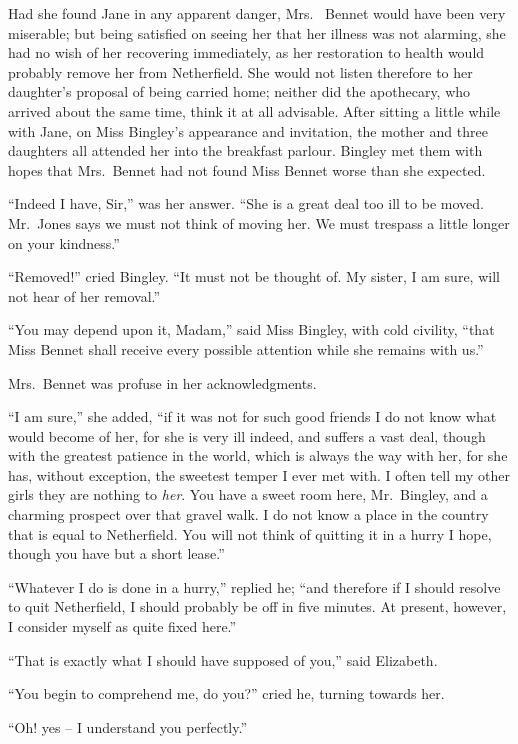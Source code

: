 Had she found Jane in any apparent danger, Mrs.\ %
Bennet would have been very miserable; but being
satisfied on seeing her that her illness was not alarming,
she had no wish of her recovering immediately, as her
restoration to health would probably remove her from
Netherfield. She would not listen therefore to her
daughter’s proposal of being carried home; neither did
the apothecary, who arrived about the same time, think
it at all advisable. After sitting a little while with Jane,
on Miss Bingley’s appearance and invitation, the mother
and three daughters all attended her into the breakfast
parlour. Bingley met them with hopes that Mrs.\ Bennet
had not found Miss Bennet worse than she expected.

“Indeed I have, Sir,” was her answer. “She is a great
deal too ill to be moved. Mr.\ Jones says we must not
think of moving her. We must trespass a little longer
on your kindness.”

“Removed!” cried Bingley. “It must not be
th\-ought of. My sister, I am sure, will not hear of her
removal.”

“You may depend upon it, Madam,” said Miss Bingley,
with cold civility, “that Miss Bennet shall receive every
possible attention while she remains with us.”

Mrs.\ Bennet was profuse in her acknowledgments.

“I am sure,” she added, “if it was not for such good
friends I do not know what would become of her, for she
is very ill indeed, and suffers a vast deal, though with the
greatest patience in the world, which is always the way with
her, for she has, without exception, the sweetest temper I
ever met with. I often tell my other girls they are nothing
to \textit{her}. You have a sweet room here, Mr.\ Bingley, and a
charming prospect over that gravel walk. I do not know
a place in the country that is equal to Netherfield. You
will not think of quitting it in a hurry I hope, though
you have but a short lease.”

“Whatever I do is done in a hurry,” replied he; “and
therefore if I should resolve to quit Netherfield, I should
probably be off in five minutes. At present, however,
I consider myself as quite fixed here.”

“That is exactly what I should have supposed of you,”
said Elizabeth.

“You begin to comprehend me, do you?” cried he,
turning towards her.

“Oh! yes -- I understand you perfectly.”

